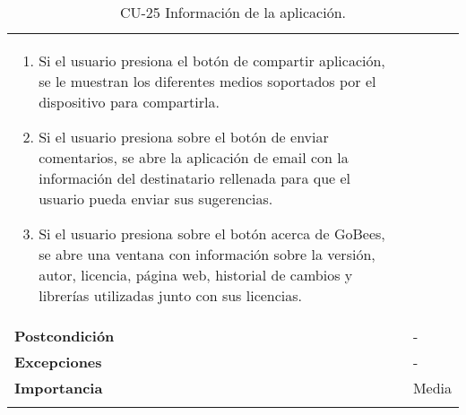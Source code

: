 \begin{longtable}[H]{@{}ll@{}}
\begin{minipage}[t]{0.68\columnwidth}
\begin{enumerate}
\def\labelenumi{\arabic{enumi}.}
\tightlist
\item
  Si el usuario presiona el botón de compartir aplicación, se le
  muestran los diferentes medios soportados por el dispositivo para
  compartirla.
\item
  Si el usuario presiona sobre el botón de enviar comentarios, se abre
  la aplicación de email con la información del destinatario rellenada
  para que el usuario pueda enviar sus sugerencias.
\item
  Si el usuario presiona sobre el botón acerca de GoBees, se abre una
  ventana con información sobre la versión, autor, licencia, página web,
  historial de cambios y librerías utilizadas junto con sus licencias.
\end{enumerate}\strut
\end{minipage}\tabularnewline
\begin{minipage}[t]{0.26\columnwidth}\raggedright\strut
\textbf{Postcondición}\strut
\end{minipage} & \begin{minipage}[t]{0.68\columnwidth}\raggedright\strut
-\strut
\end{minipage}\tabularnewline
\begin{minipage}[t]{0.26\columnwidth}\raggedright\strut
\textbf{Excepciones}\strut
\end{minipage} & \begin{minipage}[t]{0.68\columnwidth}\raggedright\strut
-\strut
\end{minipage}\tabularnewline
\begin{minipage}[t]{0.26\columnwidth}\raggedright\strut
\textbf{Importancia}\strut
\end{minipage} & \begin{minipage}[t]{0.68\columnwidth}\raggedright\strut
Media\strut
\end{minipage}\tabularnewline
\bottomrule
\caption{CU-25 Información de la aplicación.}
\end{longtable}

